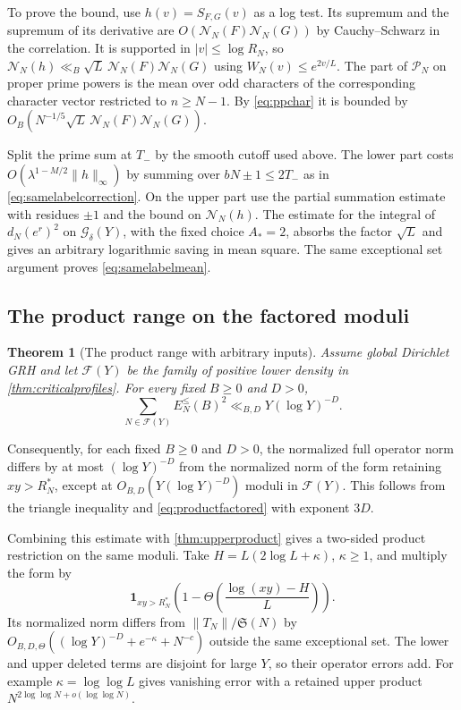 \documentclass[11pt,a4paper]{article}
\numberwithin{equation}{section}
\newtheorem{theorem}{Theorem}[section]
\newcommand{\SSS}{\mathfrak S}
\newcommand{\NN}{\mathcal N_N}
\begin{document}
To prove the bound, use $h(v)=S_{F,G}(v)$ as a log test.
Its supremum and the supremum of its derivative are
$O(\NN(F)\NN(G))$ by Cauchy--Schwarz in the correlation.
It is supported in $|v|\le\log R_N$, so
$\NN(h)\ll_B\sqrt L\,\NN(F)\NN(G)$ using
$W_N(v)\le e^{2v/L}$. The part of $\mathcal P_N$ on proper
prime powers is the mean over odd characters of the
corresponding character vector restricted to $n\ge N-1$.
By \cref{eq:ppchar} it is bounded by
$O_B(N^{-1/5}\sqrt L\,\NN(F)\NN(G))$.

Split the prime sum at $T_-$ by the smooth cutoff used
above. The lower part costs $O(\lambda^{1-M/2}\|h\|_\infty)$
by summing over $bN\pm1\le2T_-$ as in
\cref{eq:samelabelcorrection}. On the upper part use the
partial summation estimate with residues $\pm1$ and the
bound on $\NN(h)$. The estimate for the integral of
$d_N(e^r)^2$ on $\mathcal G_\delta(Y)$, with the fixed
choice $A_*=2$, absorbs the factor $\sqrt L$ and gives an
arbitrary logarithmic saving in mean square. The same
exceptional set argument proves \cref{eq:samelabelmean}.

\subsection{The product range on the factored moduli}

\begin{theorem}[The product range with arbitrary inputs]
\label{thm:productfactored}
Assume global Dirichlet GRH and let $\mathcal F(Y)$ be the family
of positive lower density in \cref{thm:criticalprofiles}.
For every fixed $B\ge0$ and $D>0$,
\begin{equation}
 \sum_{N\in\mathcal F(Y)} E_N^{\le}(B)^2
     \ll_{B,D} Y(\log Y)^{-D}.
 \label{eq:productfactored}
\end{equation}
\end{theorem}

Consequently, for each fixed $B\ge0$ and $D>0$, the normalized
full operator norm differs by at most $(\log Y)^{-D}$ from the
normalized norm of the form retaining $xy>R_N^*$, except
at $O_{B,D}(Y(\log Y)^{-D})$ moduli in $\mathcal F(Y)$.
This follows from the triangle inequality and
\cref{eq:productfactored} with exponent $3D$.

Combining this estimate with \cref{thm:upperproduct} gives
a two-sided product restriction on the same moduli.
Take $H=L(2\log L+\kappa)$, $\kappa\ge1$, and multiply the
form by
\[
 \mathbf1_{xy>R_N^*}
       \left(1-\Theta\!\left(\frac{\log(xy)-H}{L}\right)\right).
\]
Its normalized norm differs from $\|T_N\|/\SSS(N)$ by
$O_{B,D,\Theta}((\log Y)^{-D}+e^{-\kappa}+N^{-c})$ outside
the same exceptional set. The lower and upper deleted terms
are disjoint for large $Y$, so their operator errors add.
For example $\kappa=\log\log L$ gives vanishing error with
a retained upper product $N^{2\log\log N+o(\log\log N)}$.
\end{document}
